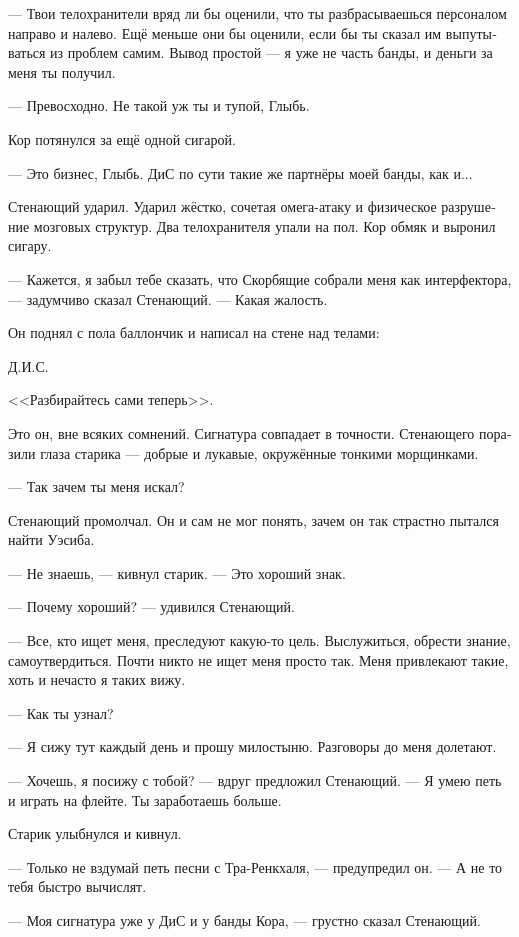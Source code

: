 \documentclass[a4paper,12pt,fleqn]{book}\usepackage{cooltooltips}\usepackage{polyglossia}\setdefaultlanguage[babelshorthands=true]{russian}\setotherlanguage{english}\defaultfontfeatures{Ligatures=TeX,Mapping=tex-text} \usepackage{xcolor}\definecolor{lightgray}{HTML}{bbbbbb}\color{lightgray}\newcommand{\ml}[3]{\textenglish{\textcolor{black}{#3}}}
\newcommand{\asterism}{\vspace{1em}{\centering\Large\bfseries$\ast~\ast~\ast$\par}\vspace{1em}}
\begin{document}
--- Твои телохранители вряд ли бы оценили, что ты разбрасываешься персоналом направо и налево.
Ещё меньше они бы оценили, если бы ты сказал им выпутываться из проблем самим.
Вывод простой --- я уже не часть банды, и деньги за меня ты получил.

--- Превосходно.
Не такой уж ты и тупой, Глыбь.

Кор потянулся за ещё одной сигарой.

--- Это бизнес, Глыбь.
ДиС по сути такие же партнёры моей банды, как и...

Стенающий ударил.
Ударил жёстко, сочетая омега-атаку и физическое разрушение мозговых структур.
Два телохранителя упали на пол.
Кор обмяк и выронил сигару.

--- Кажется, я забыл тебе сказать, что Скорбящие собрали меня как интерфектора, --- задумчиво сказал Стенающий.
--- Какая жалость.

Он поднял с пола баллончик и написал на стене над телами:

Д.И.С.

<<Разбирайтесь сами теперь>>.

\asterism

Это он, вне всяких сомнений.
Сигнатура совпадает в точности.
Стенающего поразили глаза старика --- добрые и лукавые, окружённые тонкими морщинками.

--- Так зачем ты меня искал?

Стенающий промолчал.
Он и сам не мог понять, зачем он так страстно пытался найти Уэсиба.

--- Не знаешь, --- кивнул старик.
--- Это хороший знак.

--- Почему хороший? --- удивился Стенающий.

--- Все, кто ищет меня, преследуют какую-то цель.
Выслужиться, обрести знание, самоутвердиться.
Почти никто не ищет меня просто так.
Меня привлекают такие, хоть и нечасто я таких вижу.

--- Как ты узнал?

--- Я сижу тут каждый день и прошу милостыню.
Разговоры до меня долетают.

--- Хочешь, я посижу с тобой? --- вдруг предложил Стенающий.
--- Я умею петь и играть на флейте.
Ты заработаешь больше.

Старик улыбнулся и кивнул.

--- Только не вздумай петь песни с Тра-Ренкхаля, --- предупредил он.
--- А не то тебя быстро вычислят.

--- Моя сигнатура уже у ДиС и у банды Кора, --- грустно сказал Стенающий.
\end{document}
